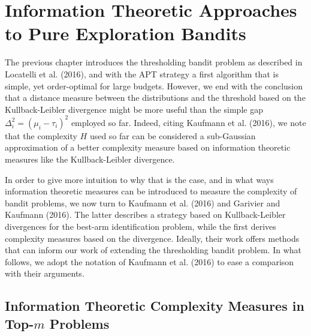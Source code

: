 \documentclass[11pt,]{article}
\begin{document}
\section{\texorpdfstring{Information Theoretic Approaches to Pure
Exploration Bandits
\label{chap:KullbackLeiblerPureExploration}}{Information Theoretic Approaches to Pure Exploration Bandits }}\label{information-theoretic-approaches-to-pure-exploration-bandits}

The previous chapter introduces the thresholding bandit problem as
described in Locatelli et al. (2016), and with the APT strategy a first
algorithm that is simple, yet order-optimal for large budgets. However,
we end with the conclusion that a distance measure between the
distributions and the threshold based on the Kullback-Leibler divergence
might be more useful than the simple gap
\(\Delta^2_i = (\mu_i - \tau_i)^2\) employed so far. Indeed, citing
Kaufmann et al. (2016), we note that the complexity \(H\) used so far
can be considered a sub-Gaussian approximation of a better complexity
measure based on information theoretic measures like the
Kullback-Leibler divergence.

In order to give more intuition to why that is the case, and in what
ways information theoretic measures can be introduced to measure the
complexity of bandit problems, we now turn to Kaufmann et al. (2016) and
Garivier and Kaufmann (2016). The latter describes a strategy based on
Kullback-Leibler divergences for the best-arm identification problem,
while the first derives complexity measures based on the divergence.
Ideally, their work offers methods that can inform our work of extending
the thresholding bandit problem. In what follows, we adopt the notation
of Kaufmann et al. (2016) to ease a comparison with their arguments.

\subsection{\texorpdfstring{Information Theoretic Complexity Measures in
Top-\(m\) Problems
\label{sec:KaufmannEtAl2016}}{Information Theoretic Complexity Measures in Top-m Problems }}\label{information-theoretic-complexity-measures-in-top-m-problems}
\end{document}
